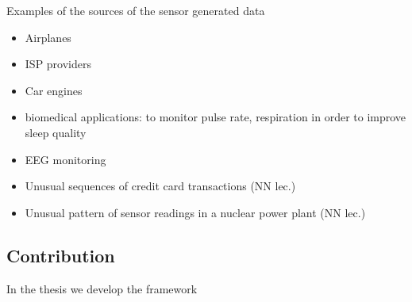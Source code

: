 Examples of the sources of the sensor generated data
\begin{itemize}
	\item Airplanes
	\item ISP providers
	\item Car engines
    \item biomedical applications: to monitor pulse rate, respiration in order to improve sleep quality 
    \item EEG monitoring 
    \item Unusual sequences of credit card transactions (NN lec.)
    \item Unusual pattern of sensor readings in a nuclear power plant (NN lec.)
\end{itemize}

\subsection{Contribution}

In the thesis we develop the framework  
